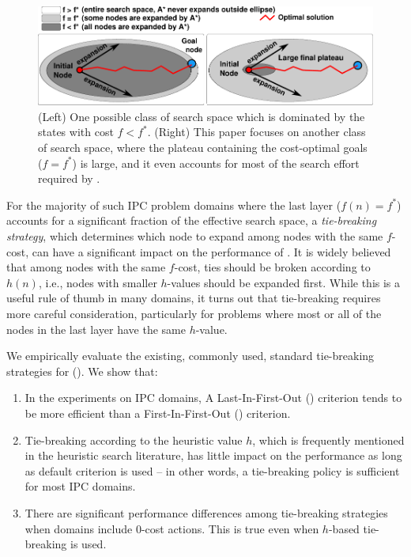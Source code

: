 \begin{figure}[htbp]
  \centering
  \includegraphics[width=\linewidth]{img/astar/plateau-0.pdf}
 \caption{(Left) One possible class of search space which is dominated by the states with cost $f<f^*$. (Right) This paper focuses on another class of search space, where the plateau containing the cost-optimal goals ($f=f^*$) is large, and it even accounts for most of the search effort required by \astar. %
  }
 \label{fig:plateau-0}
\end{figure}

For the majority of such IPC problem domains where
the last layer ($f(n)=f^*$) accounts for a significant fraction of the effective search space, a
\emph{tie-breaking strategy}, which determines which node to expand among nodes with the same $f$-cost,
can have a significant impact on the performance of \astar.
It is widely believed that among nodes with the same $f$-cost,
ties should be broken according to $h(n)$, i.e.,
nodes with smaller $h$-values should be expanded first.  While this is a
useful rule of thumb in many domains, it turns out that tie-breaking
requires more careful consideration, particularly for problems where
most or all of the nodes in the last layer have the same $h$-value.

We empirically evaluate the existing, commonly used, standard
tie-breaking strategies for \astar ().
We show that:

\begin{enumerate}
 \item In the experiments on IPC domains,
       A Last-In-First-Out (\lifo) criterion tends to be more efficient
       than a First-In-First-Out (\fifo) criterion.
 \item Tie-breaking according to the heuristic value $h$, which
       is frequently mentioned in the heuristic search literature, has little
       impact on the performance as long as \lifo default criterion is used 
       --  in other words, a \lifo tie-breaking policy is sufficient for most IPC domains.
 \item There are significant performance differences among tie-breaking strategies
       when domains include 0-cost actions. This is true even when $h$-based tie-breaking is used.
\end{enumerate}

